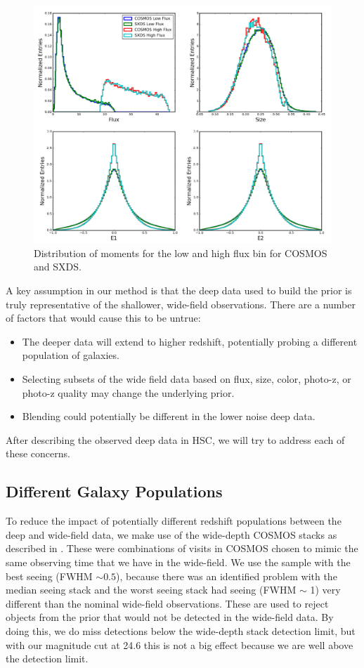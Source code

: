 \documentclass[useAMS,usenatbib]{mnras}
\begin{document}
\begin{figure}
    \includegraphics[width=\textwidth]{cosmos_sxds_bin4.png}
    \caption{
       Distribution of moments for the low and high flux bin for COSMOS and SXDS.
    }
    \label{fig:cosmos_sxds_bin4}
\end{figure}


A key assumption in our method is that the deep data used to build the prior is truly representative of the shallower, wide-field observations.  There are a number of factors that would cause this to be untrue:  
\begin{itemize}
\item The deeper data will extend to higher redshift, potentially probing a different population of galaxies.
\item Selecting subsets of the wide field data based on flux, size, color, photo-z, or photo-z quality may change the underlying prior.  
\item Blending could potentially be different in the lower noise deep data.
\end{itemize}
After describing the observed deep data in HSC, we will try to address each of these concerns.

\subsection{Different Galaxy Populations}
To reduce the impact of potentially different redshift populations between the deep and wide-field data, we make use of the wide-depth COSMOS stacks as described in \cite{DataPaper:inprep}.  These were combinations of visits in COSMOS chosen to mimic the same observing time that we have in the wide-field.  We use the sample with the best seeing (FWHM $\sim 0.5$\arcsec), because there was an identified problem with the median seeing stack and the worst seeing stack had seeing (FWHM $\sim$ 1\arcsec) very different than the nominal wide-field observations.  These are used to reject objects from the prior that would not be detected in the wide-field data.  By doing this, we do miss detections below the wide-depth stack detection limit, but with our magnitude cut at 24.6 this is not a big effect because we are well above the detection limit.
\end{document}
